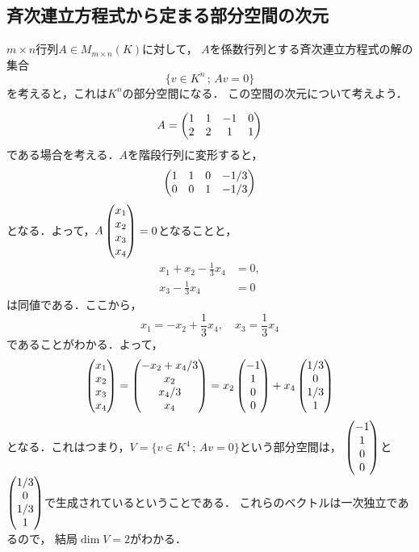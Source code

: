  \subsection{斉次連立方程式から定まる部分空間の次元}
  \label{sub:homogeneous_solution}
  $m \times n$行列$A \in M_{m\times n}(K)$に対して，
  $A$を係数行列とする斉次連立方程式の解の集合
  \[
    \{ v \in K^n \,;\, Av = 0\}  
  \]
  を考えると，これは$K^n$の部分空間になる．
  この空間の次元について考えよう．
  \begin{example}
      \[
        A = \begin{pmatrix}  1 & 1 & -1 & 0 \\ 2 & 2 & 1 & 1 \end{pmatrix}  
      \]
      である場合を考える．$A$を階段行列に変形すると，
      \[
        \begin{pmatrix} 1 & 1 & 0 & -1/3 \\ 0 & 0 & 1 & -1/3 \end{pmatrix}
      \]
      となる．よって，$A\begin{pmatrix} x_1 \\ x_2 \\ x_3 \\ x_4 \end{pmatrix} = 0$となることと，
      \[
        \begin{aligned}
          x_1 + x_2 - \frac{1}{3}x_4 &= 0,\\
          x_3 - \frac{1}{3}x_4 &= 0
        \end{aligned}
      \]
      は同値である．ここから，
      \[
        x_1 = - x_2 + \frac{1}{3}x_4,\quad x_3 = \frac{1}{3}x_4
      \]
      であることがわかる．よって，
      \[
        \begin{pmatrix} x_1 \\ x_2 \\ x_3 \\ x_4 \end{pmatrix} 
        = \begin{pmatrix} -x_2 + x_4/3 \\ x_2 \\ x_4/3 \\ x_4 \end{pmatrix}
        = x_2 \begin{pmatrix} -1 \\ 1 \\ 0 \\ 0 \end{pmatrix} + x_4 \begin{pmatrix} 1/3 \\ 0 \\ 1/3 \\ 1 \end{pmatrix}
      \]
      となる．これはつまり，$V = \{ v \in K^4 \,;\, Av = 0\}$という部分空間は，
      $\begin{pmatrix} -1 \\ 1 \\ 0 \\ 0 \end{pmatrix}$と$\begin{pmatrix} 1/3 \\ 0 \\ 1/3 \\ 1 \end{pmatrix}$で生成されているということである．
      これらのベクトルは一次独立であるので，
      結局$\dim V = 2$がわかる．
  \end{example}
